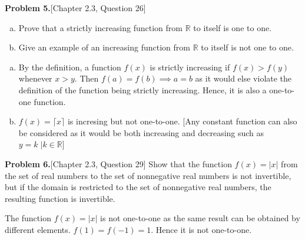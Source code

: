 \documentclass[addpoints]{exam}
\begin{document}
\begin{sloppypar}
\begin{questions}
    \question\textbf{Problem 5.}[Chapter 2.3, Question 26]
    \begin{enumerate}[(a)]
        \item Prove that a strictly increasing function from $\mathbb{R}$ to itself is one to one.
        \item Give an example of an increasing function from $\mathbb{R}$ to itself is not one to one.
    \end{enumerate}
        \begin{solution}
            \begin{enumerate}[(a)]
                \item By the definition, a function $ f(x) $ is strictly increasing if $ f(x) > f(y) $ whenever $ x > y $. Then $ f(a) = f(b) \implies a = b$ as it would else violate the definition of the function being strictly increasing. Hence, it is also a one-to-one function.
                \item $ f(x) = \lceil x \rceil $ is incresing but not one-to-one. [Any constant function can also be considered as it would be both increasing and decreasing such as $ y = k \; | k \in \mathbb{R}$]
            \end{enumerate}
        \end{solution}

    \question\textbf{Problem 6.}[Chapter 2.3, Question 29]
    Show that the function $f(x) = \lvert x \rvert$ from the set of real numbers to the set of nonnegative real numbers is not invertible, but if the domain
    is restricted to the set of nonnegative real numbers, the resulting function is invertible.
        \begin{solution}
            The function $ f(x) = | x | $ is not one-to-one as the same result can be obtained by different elements. $ f(1) = f(-1) = 1 $. Hence it is not one-to-one. 
            

\end{solution}
\end{questions}
\end{sloppypar}
\end{document}
